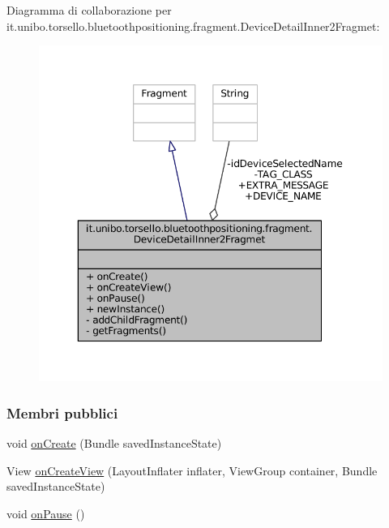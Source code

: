 Diagramma di collaborazione per it.\+unibo.\+torsello.\+bluetoothpositioning.\+fragment.\+Device\+Detail\+Inner2\+Fragmet\+:
\nopagebreak
\begin{figure}[H]
\begin{center}
\leavevmode
\includegraphics[width=350pt]{classit_1_1unibo_1_1torsello_1_1bluetoothpositioning_1_1fragment_1_1DeviceDetailInner2Fragmet__coll__graph}
\end{center}
\end{figure}
\subsubsection*{Membri pubblici}
\begin{DoxyCompactItemize}
\item 
void \hyperlink{classit_1_1unibo_1_1torsello_1_1bluetoothpositioning_1_1fragment_1_1DeviceDetailInner2Fragmet_ae07630a3636c3acb7b0f353d54a7f816_ae07630a3636c3acb7b0f353d54a7f816}{on\+Create} (Bundle saved\+Instance\+State)
\item 
View \hyperlink{classit_1_1unibo_1_1torsello_1_1bluetoothpositioning_1_1fragment_1_1DeviceDetailInner2Fragmet_a74a36f897121676ecad563c25b484018_a74a36f897121676ecad563c25b484018}{on\+Create\+View} (Layout\+Inflater inflater, View\+Group container, Bundle saved\+Instance\+State)
\item 
void \hyperlink{classit_1_1unibo_1_1torsello_1_1bluetoothpositioning_1_1fragment_1_1DeviceDetailInner2Fragmet_a4adf985f5dee5625553cdde770f82637_a4adf985f5dee5625553cdde770f82637}{on\+Pause} ()
\end{DoxyCompactItemize}
